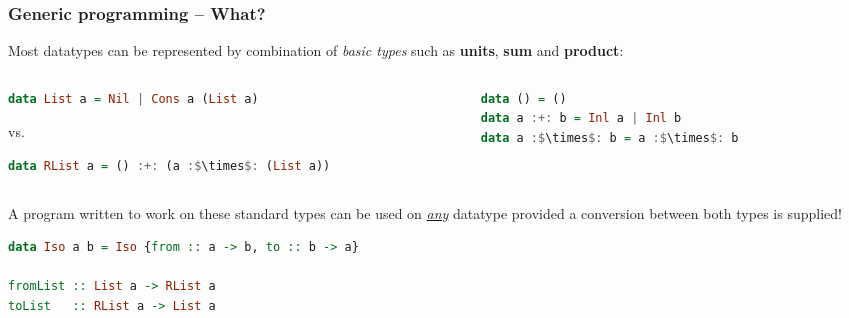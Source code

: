 \documentclass[10pt]{beamer}
\begin{document}
\begin{frame}[fragile]
\frametitle{Generic programming -- What?}
Most datatypes can be represented by combination of {\color{blue}\emph{basic types}} such as \textbf{units}, \textbf{sum} and \textbf{product}:

\begin{columns}
\begin{column}{.40\textwidth}
\begin{lstlisting}[language=Haskell,basicstyle=\ttfamily\scriptsize]
data List a = Nil | Cons a (List a)
\end{lstlisting}
\vspace{-3pt}vs.
\begin{lstlisting}[language=Haskell,basicstyle=\ttfamily\scriptsize,mathescape]
data RList a = () :+: (a :$\times$: (List a))
\end{lstlisting}
\end{column}
\begin{column}{.35\textwidth}
\begin{lstlisting}[language=Haskell,basicstyle=\ttfamily\scriptsize,mathescape]
data () = ()
data a :+: b = Inl a | Inl b
data a :$\times$: b = a :$\times$: b
\end{lstlisting}
\end{column}
\end{columns}
A program written to work on these standard types can be used on \underline{\emph{any}} datatype provided a conversion between both types is supplied!

\begin{lstlisting}[language=Haskell,basicstyle=\ttfamily\scriptsize]
data Iso a b = Iso {from :: a -> b, to :: b -> a}

fromList :: List a -> RList a
toList   :: RList a -> List a
\end{lstlisting}

\end{frame}
\end{document}
